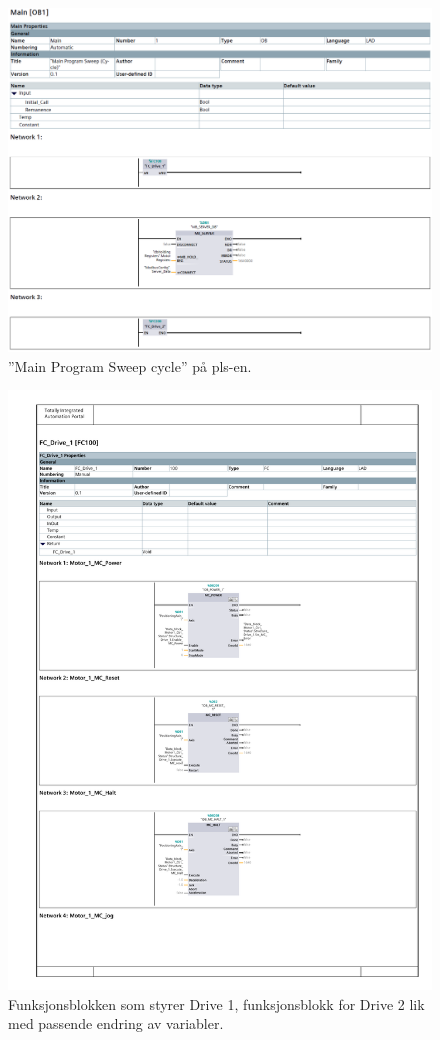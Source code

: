 \begin{figure}[H]
    \centering
    \includegraphics[width=0.5\linewidth]{FBDs/MainProgramSweep.PNG}
    \caption{''Main Program Sweep cycle'' på \acrshort{pls}-en.}
    \label{fig:OB1}
\end{figure}


\thispagestyle{empty}
{%
\begin{figure}[H]
    \centering
    \includegraphics[page=1,scale=.5]{FBDs/FC_1.pdf}
    \caption{Funksjonsblokken som styrer Drive 1,  funksjonsblokk for Drive 2 lik med passende endring av variabler.}
    \label{fig:FC1}
\end{figure}
  \par
}

\restoregeometry

